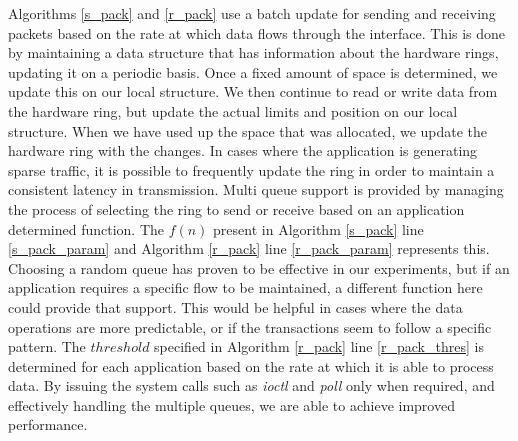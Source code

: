 \documentclass[conference]{IEEEtran}
\newcommand{\comment}[1]{}
\begin{document}
\comment{By minimizing the synchronizations with the hardware rings, we essentially limit the system calls issued and consequently improve the overall system performance.}










Algorithms \ref{s_pack} and \ref{r_pack} use a batch update for sending and receiving packets based on the rate at which data flows through the interface. This is done by maintaining a data structure that has information about the hardware rings, updating it on a periodic basis. Once a fixed amount of space is determined, we update this on our local structure. We then continue to read or write data from the hardware ring, but update the actual limits and position on our local structure. When we have used up the space that was allocated, we update the hardware ring with the changes. In cases where the application is generating sparse traffic, it is possible to frequently update the ring in order to maintain a consistent latency in transmission. Multi queue support is provided by managing the process of selecting the ring to send or receive based on an application determined function. The $f(n)$ present in Algorithm \ref{s_pack} line \ref{s_pack_param} and Algorithm \ref{r_pack} line \ref{r_pack_param} represents this. Choosing a random queue has proven to be effective in our experiments, but if an application requires a specific flow to be maintained, a different function here could provide that support. This would be helpful in cases where the data operations are more predictable, or if the transactions seem to follow a specific pattern. The $threshold$ specified in Algorithm \ref{r_pack} line \ref{r_pack_thres} is determined for each application based on the rate at which it is able to process data. By issuing the system calls such as \textit{ioctl} and \textit{poll} only when required, and effectively handling the multiple queues, we are able to achieve improved performance.


\setlength{\textfloatsep}{0pt}
\end{document}
